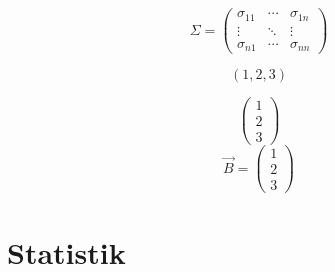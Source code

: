 \documentclass[12pt,a4paper,fleqn,twoside,pdf,final]{article}
\begin{document}
 $$
\Sigma=\left(
\begin{array}{ccc}
   \sigma_{11} & \cdots & \sigma_{1n} \\
   \vdots & \ddots & \vdots \\
   \sigma_{n1} & \cdots & \sigma_{nn}
\end{array}
\right)
$$


\newcommand*{\rowvec}[1]{\left( #1\right)}
\newcommand*{\rowvecVert}[1]{\left(\begin{array}{c}#1\end{array}\right)}

$$
\rowvec{1,2,3}
$$

$$
\left( 
\begin{array}{c}
1 \\ 2 \\ 3
\end{array}
\right)
$$
$$
\vec{B} = \rowvecVert{1 \\ 2 \\ 3}
$$

\section{Statistik}
\end{document}
